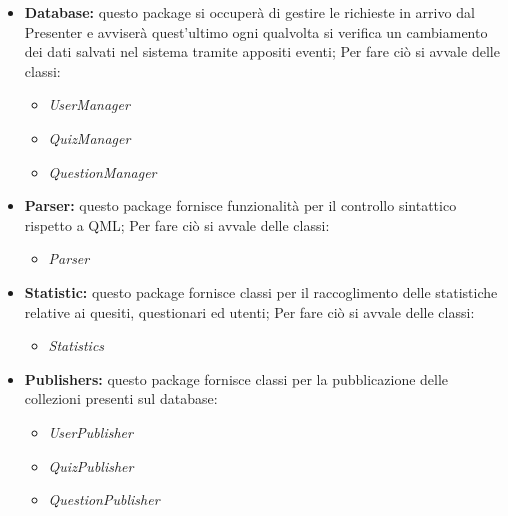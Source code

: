 	\begin{itemize}
		\item\textbf{Database:} questo package si occuperà di gestire le richieste in arrivo dal Presenter e avviserà quest'ultimo ogni qualvolta si verifica un cambiamento dei dati salvati nel sistema tramite appositi eventi; Per fare ciò si avvale delle classi:
			\begin{itemize}
				\item\textit{UserManager}
				\item\textit{QuizManager}
				\item\textit{QuestionManager}
			\end{itemize}
		\item\textbf{Parser:} questo package fornisce funzionalità per il controllo sintattico rispetto a QML; Per fare ciò si avvale delle classi:
			\begin{itemize}
				\item\textit{Parser}
			\end{itemize}
		\item\textbf{Statistic:} questo package fornisce classi per il raccoglimento delle statistiche relative ai quesiti, questionari ed utenti; Per fare ciò si avvale delle classi:
			\begin{itemize}
				\item\textit{Statistics}
			\end{itemize}
			\item\textbf{Publishers:} questo package fornisce classi per la pubblicazione delle collezioni presenti sul database:
			\begin{itemize}
				\item\textit{UserPublisher}
				\item\textit{QuizPublisher}
				\item\textit{QuestionPublisher}
			\end{itemize}
		\end{itemize}
		\newpage